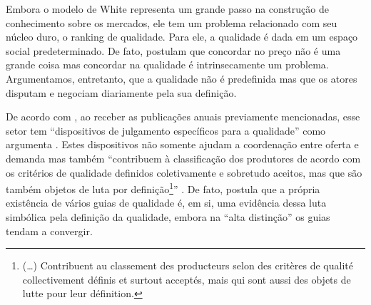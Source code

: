 \documentclass[a4paper, 12pt, openright, oneside, german, french, english, brazil]{abntex2}
\begin{document}
	
	Embora o modelo de White representa um grande passo na construção de conhecimento sobre os mercados, ele tem um problema relacionado com seu núcleo duro, o ranking de qualidade. Para ele, a qualidade é dada em um espaço social predeterminado. De fato,  postulam que concordar no preço não é uma grande coisa mas concordar na qualidade é intrinsecamente um problema. Argumentamos, entretanto, que a qualidade não é predefinida mas que os atores disputam e negociam diariamente pela sua definição.
	
	
	De acordo com , ao receber as publicações anuais previamente mencionadas, esse setor tem ``dispositivos de julgamento específicos para a qualidade'' como argumenta . Estes dispositivos não somente ajudam a coordenação entre oferta e demanda mas também ``contribuem à classificação dos produtores de acordo com os critérios de qualidade definidos coletivamente e sobretudo aceitos, mas que são também objetos de luta por definição\footnote{(\dots) Contribuent au classement des producteurs selon des critères de qualité collectivement définis et surtout acceptés, mais qui sont aussi des objets de lutte pour leur définition.}'' \cite[p. 494]{eloire2009reseaux}. De fato,  postula que a própria existência de vários guias de qualidade é, em si, uma evidência dessa luta simbólica pela definição da qualidade, embora na ``alta distinção'' os guias tendam a convergir.
	
\end{document}
